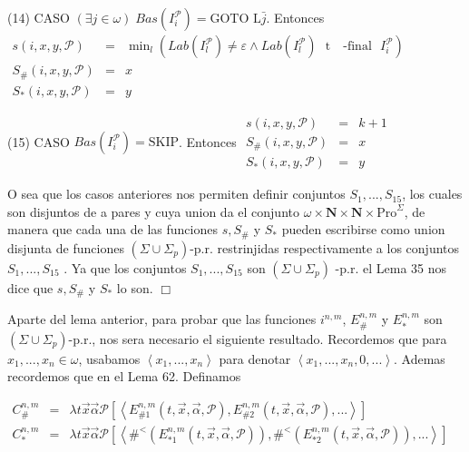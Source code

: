 (14) CASO \((\exists j\in \omega )\;Bas(I_{i}^{\mathcal{P}})=\mathrm{ GOTO}\) \(\mathrm{L}\bar{j}\). Entonces
\(\displaystyle \begin{array}{rcl} s(i,x,y,\mathcal{P}) & =& \min_{l}\left( Lab(I_{l}^{\mathcal{P}})\neq \varepsilon \wedge Lab(I_{l}^{\mathcal{P}})\text{ }\mathrm{t}\text{ { -final} }I_{i}^{\mathcal{P}}\right) \\ S_{\#}(i,x,y,\mathcal{P}) & =& x \\ S_{\ast }(i,x,y,\mathcal{P}) & =& y \end{array} \)

(15) CASO \(Bas(I_{i}^{\mathcal{P}})=\mathrm{SKIP}\). Entonces
\(\displaystyle \begin{array}{rcl} s(i,x,y,\mathcal{P}) & =& k+1 \\ S_{\#}(i,x,y,\mathcal{P}) & =& x \\ S_{\ast }(i,x,y,\mathcal{P}) & =& y \end{array} \)

O sea que los casos anteriores nos permiten definir conjuntos \( S_{1},...,S_{15}\), los cuales son disjuntos de a pares y cuya union da el conjunto \(\omega \times \mathbf{N}\times \mathbf{N}\times \mathrm{Pro} ^{\Sigma }\), de manera que cada una de las funciones \(s,S_{\#}\) y \(S_{\ast }\) pueden escribirse como union disjunta de funciones \((\Sigma \cup \Sigma _{p}) \)-p.r. restrinjidas respectivamente a los conjuntos \(S_{1},...,S_{15}\) . Ya que los conjuntos \(S_{1},...,S_{15}\) son \((\Sigma \cup \Sigma _{p})\) -p.r. el Lema 35 nos dice que \(s,S_{\#}\) y \(S_{\ast }\) lo son. \(\Box\)

Aparte del lema anterior, para probar que las funciones \(i^{n,m}\), \( E_{\#}^{n,m}\) y \(E_{\ast }^{n,m}\) son \((\Sigma \cup \Sigma _{p})\)-p.r., nos sera necesario el siguiente resultado. Recordemos que para \( x_{1},...,x_{n}\in \omega \), usabamos \(\left\langle x_{1},...,x_{n}\right\rangle \) para denotar \(\left\langle x_{1},...,x_{n},0,...\right\rangle \). Ademas recordemos que en el Lema 62. Definamos

\(\displaystyle \begin{array}{rcl} C_{\#}^{n,m} & =& \lambda t\vec{x}\vec{\alpha}\mathcal{P}\left[ \left\langle E_{\#1}^{n,m}(t,\vec{x},\vec{\alpha},\mathcal{P}),E_{\#2}^{n,m}(t,\vec{x}, \vec{\alpha},\mathcal{P}),...\right\rangle \right] \\ C_{\ast }^{n,m} & =& \lambda t\vec{x}\vec{\alpha}\mathcal{P}\left[ \left\langle \#^{< }(E_{\ast 1}^{n,m}(t,\vec{x},\vec{\alpha},\mathcal{P} )),\#^{< }(E_{\ast 2}^{n,m}(t,\vec{x},\vec{\alpha},\mathcal{P} )),...\right\rangle \right] \end{array} \)

